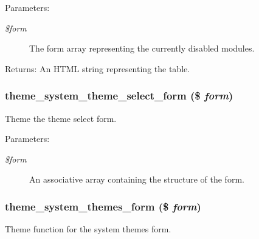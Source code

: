 \begin{Desc}
\item[Parameters:]
\begin{description}
\item[{\em \$form}]The form array representing the currently disabled modules. \end{description}
\end{Desc}
\begin{Desc}
\item[Returns:]An HTML string representing the table. \end{Desc}
\hypertarget{group__themeable_gf0fc0dd74af2e379fa3509f7d06c4ecf}{
\subsubsection[{theme\_\-system\_\-theme\_\-select\_\-form}]{\setlength{\rightskip}{0pt plus 5cm}theme\_\-system\_\-theme\_\-select\_\-form (\$ {\em form})}}
\label{group__themeable_gf0fc0dd74af2e379fa3509f7d06c4ecf}


Theme the theme select form. \begin{Desc}
\item[Parameters:]
\begin{description}
\item[{\em \$form}]An associative array containing the structure of the form. \end{description}
\end{Desc}
\hypertarget{group__themeable_ga544bfd98c5a8b7e136fae3fd71207bc}{
\subsubsection[{theme\_\-system\_\-themes\_\-form}]{\setlength{\rightskip}{0pt plus 5cm}theme\_\-system\_\-themes\_\-form (\$ {\em form})}}
\label{group__themeable_ga544bfd98c5a8b7e136fae3fd71207bc}


Theme function for the system themes form.

